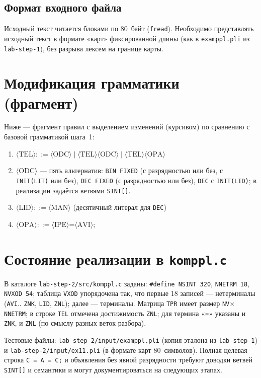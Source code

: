 \documentclass[a4paper,14pt]{extarticle}
\begin{document}
\subsection{Формат входного файла}

Исходный текст читается блоками по 80~байт (\texttt{fread}). Необходимо
представлять исходный текст в формате «карт» фиксированной длины (как в
\texttt{examppl.pli} из \texttt{lab-step-1}), без разрыва лексем на границе
карты.

\section{Модификация грамматики (фрагмент)}

Ниже --- фрагмент правил с выделением изменений (курсивом) по сравнению с базовой
грамматикой шага~1:

\begin{enumerate}
  \item $\langle\text{TEL}\rangle ::= \langle\text{ODC}\rangle \mid \langle\text{TEL}\rangle\langle\text{ODC}\rangle \mid \langle\text{TEL}\rangle\langle\text{OPA}\rangle$
  \item $\langle\text{ODC}\rangle$ --- пять альтернатив: \texttt{BIN FIXED} (с разрядностью или без, с \texttt{INIT(LIT)} или без), \texttt{DEC FIXED} (с разрядностью или без), \texttt{DEC} с \texttt{INIT(LID)}; в реализации задаётся ветвями \texttt{SINT[]}.
  \item $\langle\text{LID}\rangle ::= \langle\text{MAN}\rangle$ (десятичный литерал для \texttt{DEC})
  \item $\langle\text{OPA}\rangle ::= \langle\text{IPE}\rangle\texttt{=}\langle\text{AVI}\rangle\texttt{;}$
\end{enumerate}

\section{Состояние реализации в \texttt{komppl.c}}

В каталоге \texttt{lab-step-2/src/komppl.c} заданы:
\texttt{\#define NSINT 320}, \texttt{NNETRM 18}, \texttt{NVXOD 54}; таблица
\texttt{VXOD} упорядочена так, что первые 18 записей --- нетерминалы
(\texttt{AVI}.. \texttt{ZNK}, \texttt{LID}, \texttt{ZNL}); далее --- терминалы.
Матрица \texttt{TPR} имеет размер \texttt{NV}$\times$\texttt{NNETRM}; в строке
\texttt{TEL} отмечена достижимость \texttt{ZNL}; для термина «\texttt{=}»
указаны и \texttt{ZNK}, и \texttt{ZNL} (по смыслу разных веток разбора).

Тестовые файлы: \texttt{lab-step-2/input/examppl.pli} (копия эталона из
\texttt{lab-step-1}) и \texttt{lab-step-2/input/ex11.pli} (в формате карт
80~символов). Полная целевая строка \texttt{C = A = C;} и объявления без явной
разрядности требуют доводки ветвей \texttt{SINT[]} и семантики и могут
документироваться на следующих этапах.

\end{document}
